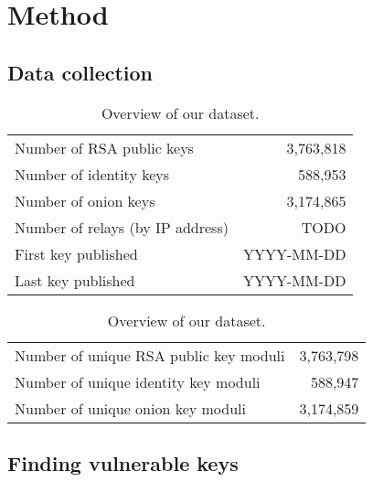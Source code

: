 \section{Method}

\subsection{Data collection}

\begin{table}[t]
	\centering
	\begin{tabular}{l r}
	\toprule
	Number of RSA public keys & 3,763,818 \\
	Number of identity keys & 588,953 \\
	Number of onion keys & 3,174,865 \\
	\midrule
	Number of relays (by IP address) & TODO \\
	First key published & YYYY-MM-DD \\
	Last key published & YYYY-MM-DD \\
	\bottomrule
	\end{tabular}
	\caption{Overview of our dataset.}
	\label{tab:dataset}
\end{table}

\begin{table}[t]
	\centering
	\begin{tabular}{l r}
	\toprule
	Number of unique RSA public key moduli & 3,763,798 \\
	Number of unique identity key moduli & 588,947 \\
	Number of unique onion key moduli & 3,174,859 \\
	\bottomrule
	\end{tabular}
	\caption{Overview of our dataset.}
	\label{tab:dataset}
\end{table}

\subsection{Finding vulnerable keys}
